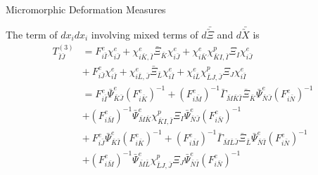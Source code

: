 \documentclass[11pt]{beamer}
\newcommand{\VEC}[1]{\utilde{#1}}
\begin{document}
\begin{frame}{Micromorphic Deformation Measures}

The term of $dx_i dx_i$ involving mixed terms of $d\bar{\VEC{\Xi}}$ and $d\bar{\VEC{X}}$ is
\begin{align*}
T_{\bar{I}\bar{J}}^{(3)} &= F_{i\bar{I}}^e \chi_{i\bar{J}}^e + \chi_{i\bar{K},\bar{I}}^e \bar{\Xi}_{\bar{K}} \chi_{i\bar{J}}^e + \chi_{i\bar{K}}^e \chi_{\bar{K}I,\bar{I}}^p \Xi_{I} \chi_{i\bar{J}}^e\\
&+\ F_{i\bar{J}}^e \chi_{i\bar{I}}^e + \chi_{i\bar{L},\bar{J}}^e \bar{\Xi}_{\bar{L}} \chi_{i\bar{I}}^e + \chi_{i\bar{L}}^e \chi_{\bar{L}J,\bar{J}}^p \Xi_{J} \chi_{i\bar{I}}^e\\
&= F_{i\bar{I}}^e \bar{\Psi}_{\bar{K}\bar{J}}^e \left(F_{i\bar{K}}^e\right)^{-1} + \left(F_{i\bar{M}}^e\right)^{-1} \bar{\Gamma}_{\bar{M}\bar{K}\bar{I}} \bar{\Xi}_{\bar{K}} \bar{\Psi}_{\bar{N}\bar{J}}^e \left(F_{i\bar{N}}^e\right)^{-1}\\
& + \left(F_{i\bar{M}}^e\right)^{-1} \bar{\Psi}_{\bar{M}\bar{K}}^e \chi_{\bar{K}I,\bar{I}}^p \Xi_{I} \bar{\Psi}_{\bar{N}\bar{J}}^e \left(F_{i\bar{N}}^e\right)^{-1}\\
&+\ F_{i\bar{J}}^e\bar{\Psi}_{\bar{K}\bar{I}}^e \left(F_{i\bar{K}}^e\right)^{-1} + \left(F_{i\bar{M}}^e\right)^{-1} \bar{\Gamma}_{\bar{M}\bar{L}\bar{J}} \bar{\Xi}_{\bar{L}} \bar{\Psi}_{\bar{N}\bar{I}}^e \left(F_{i\bar{N}}^e\right)^{-1}\\
& + \left(F_{i\bar{M}}^e\right)^{-1} \bar{\Psi}_{\bar{M}\bar{L}}^e \chi_{\bar{L}J,\bar{J}}^p \Xi_{J} \bar{\Psi}_{\bar{N}\bar{I}}^e \left(F_{i\bar{N}}^e\right)^{-1}\\
\end{align*}

\end{frame}
\end{document}
